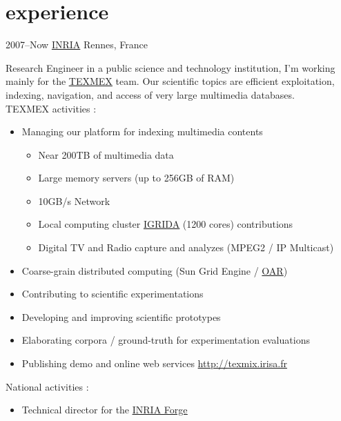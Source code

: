 \documentclass[]{friggeri-cv} %
\begin{document}

\section{experience}

\begin{entrylist}

\entry
{2007--Now}
{\href{http://www.inria.fr/}{INRIA}}
{Rennes, France}
{ 
Research Engineer in a public science and technology institution, I'm working mainly for the \href{http://www.irisa.fr/texmex/}{\underline{TEXMEX}} team. Our scientific topics are efficient exploitation, indexing, navigation, and access of very large multimedia databases.
 \\
TEXMEX activities : 
\begin{itemize}
\item Managing our platform for indexing  multimedia contents  
\begin{itemize}
\item Near 200TB of multimedia data
\item Large memory servers (up to 256GB of RAM)
\item 10GB/s Network
\item Local computing cluster \href{http://igrida.gforge.inria.fr}{\underline{IGRIDA}} (1200 cores) contributions
\item Digital TV and Radio capture and analyzes (MPEG2 / IP Multicast)
\end{itemize}
\item Coarse-grain distributed computing (Sun Grid Engine / \href{http://oar.imag.fr}{OAR})
\item Contributing to scientific experimentations
\item Developing and improving scientific prototypes 
\item Elaborating corpora / ground-truth for experimentation evaluations 
\item Publishing demo and online web services \url{http://texmix.irisa.fr}
\end{itemize}

National activities : 
\begin{itemize}
\item Technical director for the \href{http://gforge.inria.fr}{\underline{INRIA Forge}} 


\end{itemize}}
\end{entrylist}
\end{document}
